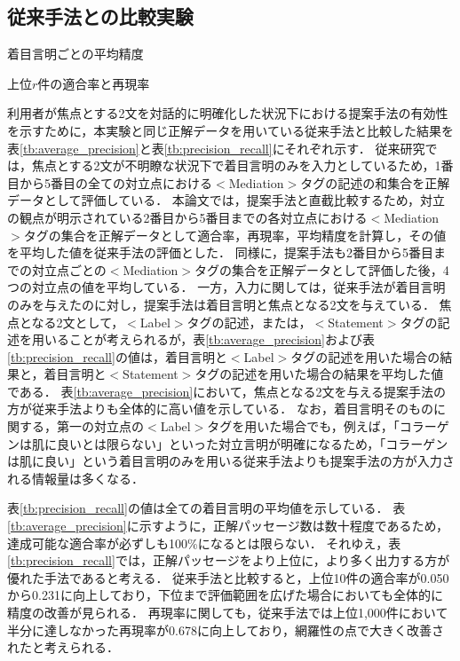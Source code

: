 \documentclass[japanese]{jnlp_1.4}
\begin{document}
\subsection{従来手法との比較実験}

\begin{table}[t]
 \caption{着目言明ごとの平均精度}
 \label{tb:average_precision}

\end{table}
\begin{table}[t]
 \caption{上位$r$件の適合率と再現率}
 \label{tb:precision_recall}

\end{table}

利用者が焦点とする2文を対話的に明確化した状況下における提案手法の有効性を示すために，本実験と同じ正解データを用いている従来手法\cite{Shibuki2011a}と比較した結果を表\ref{tb:average_precision}と表\ref{tb:precision_recall}にそれぞれ示す．
従来研究\cite{Shibuki2011a}では，焦点とする2文が不明瞭な状況下で着目言明のみを入力としているため，1番目から5番目の全ての対立点における{\sf$<$Mediation$>$}タグの記述の和集合を正解データとして評価している．
本論文では，提案手法と直截比較するため，対立の観点が明示されている2番目から5番目までの各対立点における{\sf$<$Mediation$>$}タグの集合を正解データとして適合率，再現率，平均精度を計算し，その値を平均した値を従来手法の評価とした．
同様に，提案手法も2番目から5番目までの対立点ごとの{\sf$<$Mediation$>$}タグの集合を正解データとして評価した後，4つの対立点の値を平均している．
一方，入力に関しては，従来手法が着目言明のみを与えたのに対し，提案手法は着目言明と焦点となる2文を与えている．
焦点となる2文として，{\sf$<$Label$>$}タグの記述，または，{\sf$<$Statement$>$}タグの記述を用いることが考えられるが，表\ref{tb:average_precision}および表\ref{tb:precision_recall}の値は，着目言明と{\sf$<$Label$>$}タグの記述を用いた場合の結果と，着目言明と{\sf$<$Statement$>$}タグの記述を用いた場合の結果を平均した値である．
表\ref{tb:average_precision}において，焦点となる2文を与える提案手法の方が従来手法よりも全体的に高い値を示している．
なお，着目言明そのものに関する，第一の対立点の{\sf$<$Label$>$}タグを用いた場合でも，例えば，「コラーゲンは肌に良いとは限らない」といった対立言明が明確になるため，「コラーゲンは肌に良い」という着目言明のみを用いる従来手法よりも提案手法の方が入力される情報量は多くなる．

表\ref{tb:precision_recall}の値は全ての着目言明の平均値を示している．
表\ref{tb:average_precision}に示すように，正解パッセージ数は数十程度であるため，達成可能な適合率が必ずしも100\%になるとは限らない．
それゆえ，表\ref{tb:precision_recall}では，正解パッセージをより上位に，より多く出力する方が優れた手法であると考える．
従来手法と比較すると，上位10件の適合率が0.050から0.231に向上しており，下位まで評価範囲を広げた場合においても全体的に精度の改善が見られる．
再現率に関しても，従来手法では上位1,000件において半分に達しなかった再現率が0.678に向上しており，網羅性の点で大きく改善されたと考えられる．
\end{document}
